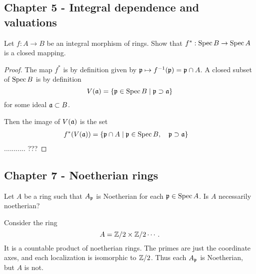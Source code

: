 \documentclass[11pt, english]{article}
\begin{document}
\subsection{Chapter 5 - Integral dependence and valuations}

\begin{exc}[Exercise 1]

Let $f:A \to B$ be an integral morphism of rings. Show that $f^\ast:\operatorname{Spec} B \to \operatorname{Spec} A$ is a closed mapping.  
\end{exc}
\begin{proof}
The map $f^\ast$ is by definition given by $\mathfrak{p} \mapsto f^{-1}(\mathfrak{p}) = \mathfrak{p} \cap A$. A closed subset of $\operatorname{Spec} B$ is by definition 
\[
V(\mathfrak{a}) = \{ \mathfrak{p} \in \operatorname{Spec} B \mid \mathfrak{p} \supset \mathfrak{a} \}
\]
for some ideal $\mathfrak{a} \subset B$.

Then the image of $V(\mathfrak{a})$ is the set
\begin{align*}
f^\ast(V(\mathfrak{a})) &= \{ \mathfrak{p} \cap A \mid \mathfrak{p} \in \operatorname{Spec} B, \quad  \mathfrak{p} \supset \mathfrak{a} \} 
\end{align*}
........... ???
\end{proof}

\subsection{Chapter 7 - Noetherian rings}

\begin{exc}[Exercise 11]
Let $A$ be a ring such that $A_{\mathfrak{p}}$ is Noetherian for each $\mathfrak{p} \in \operatorname{Spec} A$. Is $A$ necessarily noetherian?
\end{exc}
\begin{sol}
Consider the ring
\[
A= \mathbb{Z}/2 \times \mathbb{Z}/2 \cdots .
\]
It is a countable product of noetherian rings. The primes are just the coordinate axes, and each localization is isomorphic to $\mathbb{Z}/2$. Thus each $A_{\mathfrak{p}}$ is Noetherian, but $A$ is not.
\end{sol}
\end{document}
